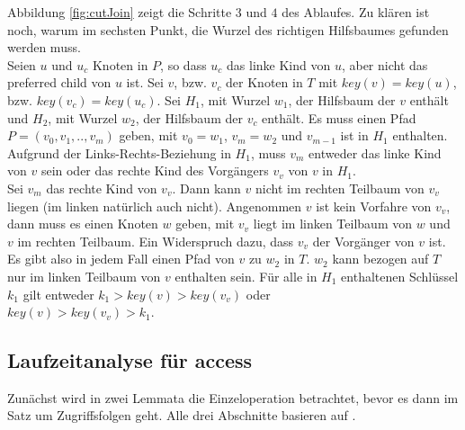 \documentclass[a4paper,12pt]{article}
\begin{document}
Abbildung \ref{fig:cutJoin} zeigt die Schritte $3$ und $4$ des Ablaufes.
Zu klären ist noch, warum im sechsten Punkt, die Wurzel des richtigen Hilfsbaumes gefunden werden muss.\\ Seien $u$ und $u_c$ Knoten in $P$, so dass $u_c$ das linke Kind von $u$, aber nicht das preferred child von $u$ ist. Sei $v$, bzw. $v_c$ der Knoten in $T$ mit $\mathit{key}\left(v\right) = \mathit{key}\left(u\right)$, bzw. $\mathit{key}\left(v_c\right) = \mathit{key}\left(u_c\right)$. Sei $H_1$, mit Wurzel $w_1$, der Hilfsbaum der $v$ enthält und $H_2$, mit Wurzel $w_2$, der Hilfsbaum der $v_c$ enthält. Es muss einen Pfad $P = \left(v_0, v_1,.., v_m \right)$ geben, mit $v_0 = w_1$, $v_m = w_2$ und $v_{m-1}$ ist in $H_1$ enthalten. Aufgrund der Links-Rechts-Beziehung in $H_1$, muss $v_m$ entweder das linke Kind von $v$ sein oder das rechte Kind des Vorgängers $v_v$ von $v$ in $H_1$. \\
Sei $v_m$ das rechte Kind von $v_v$. Dann kann $v$ nicht im rechten Teilbaum von $v_v$ liegen (im linken natürlich auch nicht). Angenommen $v$ ist kein Vorfahre von $v_v$, dann muss es einen Knoten $w$ geben, mit $v_v$ liegt im linken Teilbaum von $w$ und $v$ im rechten Teilbaum. Ein Widerspruch dazu, dass $v_v$ der Vorgänger von $v$ ist.\\
Es gibt also in jedem Fall einen Pfad von $v$ zu $w_2$ in $T$. $w_2$ kann bezogen auf $T$ nur im linken Teilbaum von $v$ enthalten sein. Für alle in $H_1$ enthaltenen Schlüssel $k_1$ gilt entweder $k_1 > \mathit{key}\left(v\right) > \mathit{key}\left(v_v\right) $ oder \\ $ \mathit{key}\left(v\right) > \mathit{key}\left(v_v\right) > k_1 $. 


\subsection{Laufzeitanalyse für access}
Zunächst wird in zwei Lemmata die Einzeloperation betrachtet, bevor es dann im Satz um Zugriffsfolgen geht. Alle drei Abschnitte basieren auf \cite{demainDinamicOpti}.
\end{document}
